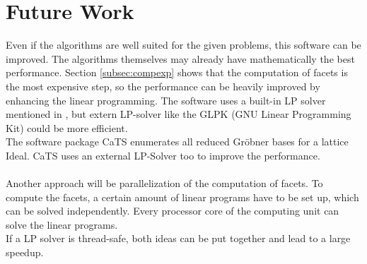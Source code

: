 \section{Future Work}
Even if the algorithms are well suited for the given problems, this software can be improved.
The algorithms themselves may already have mathematically the best performance. 
Section \ref{subsec:compexp} shows that the computation of facets is the most expensive step, so the performance can be heavily improved by enhancing the linear programming.
The software uses a built-in LP solver mentioned in \cite{tigers}, but extern LP-solver like the GLPK (GNU Linear Programming Kit) could be more efficient. \\
The software package CaTS \cite{cats} enumerates all reduced Gröbner bases for a lattice Ideal. CaTS uses an external LP-Solver too to improve the performance.
\\\\
Another approach will be parallelization of the computation of facets. To compute the facets, a certain amount of linear programs have to be set up, which can be solved independently. Every processor core of the computing unit can solve the linear programs.\\
If a LP solver is thread-safe, both ideas can be put together and lead to a large speedup. 

\newpage